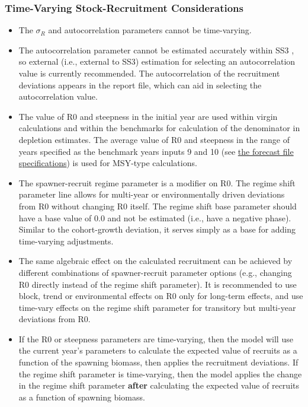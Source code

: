 \hypertarget{tv-sr}{}
\subsubsection{Time-Varying Stock-Recruitment Considerations}
\begin{itemize}
	
	\item The $\sigma_R$ and autocorrelation parameters cannot be time-varying. 
	
	\item The autocorrelation parameter cannot be estimated accurately within SS3 \citep{johnson-can-2016}, so external (i.e., external to SS3) estimation for selecting an autocorrelation value is currently recommended. The autocorrelation of the recruitment deviations appears in the report file, which can aid in selecting the autocorrelation value.
		
	\item The value of R0 and steepness in the initial year are used within virgin calculations and within the benchmarks for calculation of the denominator in depletion estimates. The average value of R0 and steepness in the range of years specified as the benchmark years inputs 9 and 10 (see \hyperlink{fore-specify}{the forecast file specifications}) is used for MSY-type calculations. 
	
	\item The spawner-recruit regime parameter is a modifier on R0. The regime shift parameter line allows for multi-year or environmentally driven deviations from R0 without changing R0 itself. The regime shift base parameter should have a base value of 0.0 and not be estimated (i.e., have a negative phase). Similar to the cohort-growth deviation, it serves simply as a base for adding time-varying adjustments.
	
	\item The same algebraic effect on the calculated recruitment can be achieved by different combinations of spawner-recruit parameter options (e.g., changing R0 directly instead of the regime shift parameter). It is recommended to use block, trend or environmental effects on R0 only for long-term effects, and use time-vary effects on the regime shift parameter for transitory but multi-year deviations from R0.	
	
	\item If the R0 or steepness parameters are time-varying, then the model will use the current year's parameters to calculate the expected value of recruits as a function of the spawning biomass, then applies the recruitment deviations. If the regime shift parameter is time-varying, then the model applies the change in the regime shift parameter \textbf{after} calculating the expected value of recruits as a function of spawning biomass.

\end{itemize}


